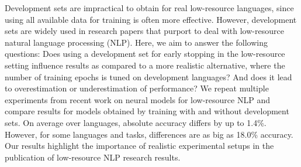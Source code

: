 Development sets are impractical to obtain for real low-resource languages, since using all available data for training is often more effective. However, development sets are widely used in research papers that purport to deal with low-resource natural language processing (NLP). Here, we aim to answer the following questions: Does using a development set for early stopping in the low-resource setting influence results as compared to a more realistic alternative, where the number of training epochs is tuned on development languages? And does it lead to overestimation or underestimation of performance? We repeat multiple experiments from recent work on neural models for low-resource NLP and compare results for models obtained by training with and without development sets. On average over languages, absolute accuracy differs by up to 1.4\%. However, for some languages and tasks, differences are as big as 18.0\% accuracy. Our results highlight the importance of realistic experimental setups in the publication of low-resource NLP research results.